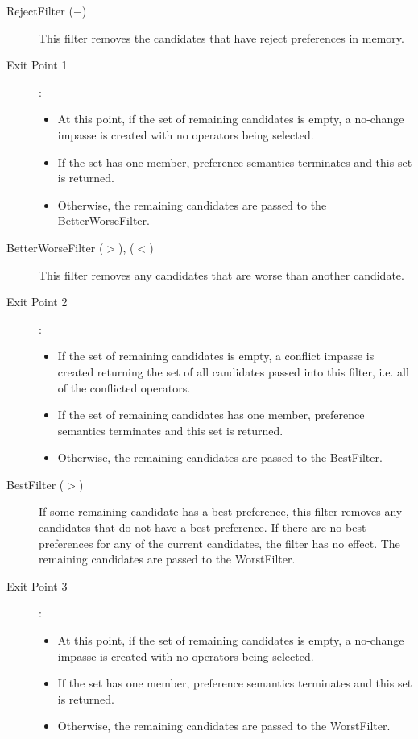 \begin{description}
	\item[RejectFilter ($-$) ] This filter removes the candidates that have reject preferences in memory. 
	
	\index{-}
	\item[Exit Point 1]:
	\begin{itemize}
		\item At this point, if the set of remaining candidates is empty, a no-change impasse is created with no operators being selected.
		\item If the set has one member, preference semantics terminates and this set is returned.
		\item Otherwise, the remaining candidates are passed to the BetterWorseFilter.
	\end{itemize}
	
	\item[BetterWorseFilter ($>$), ($<$) ] This filter removes any candidates that are worse than another candidate.
	
	\index{-}
	\item[Exit Point 2]:
	\begin{itemize}
		\item If the set of remaining candidates is empty, a conflict impasse is created returning the set of all candidates passed into this filter, i.e. all of the conflicted operators.
		\item If the set of remaining candidates has one member, preference semantics terminates and this set is returned.
		\item Otherwise, the remaining candidates are passed to the BestFilter.
	\end{itemize}
	
	\item[BestFilter ($>$) ] If some remaining candidate has a best preference, this filter removes any candidates that do not have a best preference. If there are no best preferences for any of the current candidates, the filter has no effect. The remaining candidates are passed to the WorstFilter.
	
	\index{-}
	\item[Exit Point 3]:
	\begin{itemize}
		\item At this point, if the set of remaining candidates is empty, a no-change impasse is created with no operators being selected.
		\item If  the set has one member, preference semantics terminates and this set is returned.
		\item Otherwise, the remaining candidates are passed to the WorstFilter.
	\end{itemize}
	

\end{description}
